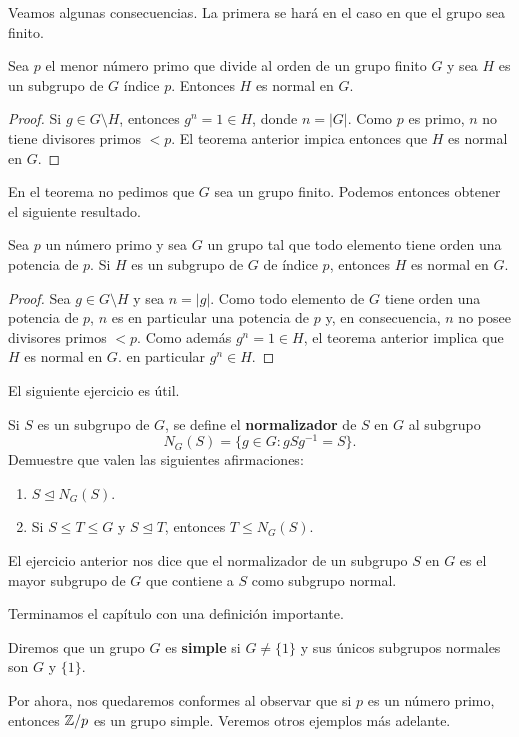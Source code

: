 Veamos algunas consecuencias. La primera se hará en el caso en que el grupo sea finito. 

\begin{corollary}
\label{cor:p_menor}
	Sea $p$ el menor número primo que divide al orden de un grupo finito  
	$G$ y sea $H$ es un subgrupo de $G$ índice $p$. Entonces $H$ es normal en $G$. 
\end{corollary}

\begin{proof}
	Si $g\in G\setminus H$, entonces $g^n=1\in H$, donde $n=|G|$. Como $p$ es primo, $n$ no tiene divisores primos $<p$. El teorema anterior impica entonces que $H$ es normal en $G$. 
\end{proof}

En el teorema no pedimos que $G$ sea un grupo finito. Podemos entonces obtener el siguiente resultado.

\begin{corollary}
Sea $p$ un número primo y sea $G$ un grupo tal que todo elemento tiene orden una potencia de $p$. Si $H$ es un subgrupo de $G$ de índice $p$, entonces $H$ es normal en $G$.  
\end{corollary}

\begin{proof}
Sea $g\in G\setminus H$ y sea $n=|g|$. Como todo elemento de $G$ tiene orden una potencia de $p$, 
$n$ es en particular una potencia de $p$ y, en consecuencia, $n$ no posee divisores primos $<p$. Como además $g^n=1\in H$, el teorema anterior implica que $H$ es normal en $G$. 
en particular $g^n\in H$.  	
\end{proof}

El siguiente ejercicio es útil. 

\begin{exercise}
Si $S$ es un subgrupo de $G$, se define el \textbf{normalizador} de $S$ en $G$ al subgrupo
\[
N_G(S)=\{g\in G:gSg^{-1}=S\}.
\]	
Demuestre que valen las siguientes afirmaciones:
\begin{enumerate}
\item $S\unlhd N_G(S)$.
\item Si $S\leq T\leq G$ y $S\unlhd T$, entonces $T\leq N_G(S)$.
\end{enumerate}
\end{exercise}

El ejercicio anterior nos dice que el normalizador de un subgrupo $S$ en $G$ es el mayor subgrupo de $G$ que contiene a $S$ como subgrupo normal. 

Terminamos el capítulo con una definición importante. 

\begin{definition}
Diremos que un grupo $G$ es \textbf{simple} si $G\ne\{1\}$ y sus únicos subgrupos normales
son $G$ y $\{1\}$.
\end{definition}

Por ahora, nos quedaremos conformes al observar que si $p$ es un número primo, entonces $\mathbb{Z}/p$ es un grupo simple. Veremos otros ejemplos más adelante.  

